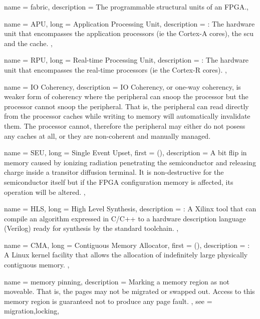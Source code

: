 {
	name = {fabric},
	description = {The programmable structural units of an FPGA.},
}

{
	name = {APU},
	long = {Application Processing Unit},
	description = {\emph{}:
		The hardware unit that encompasses the application processors (ie the Cortex-A cores),
		the \gls{scu} and the cache.
	},
}

{
	name = {RPU},
	long = {Real-time Processing Unit},
	description = {\emph{}:
		The hardware unit that encompasses the real-time processors (ie the Cortex-R cores).
	},
}


{
	name = {IO Coherency},
	description = {
		IO Coherency, or one-way coherency, is weaker form of coherency where
		the peripheral can snoop the processor but the processor cannot snoop the peripheral.
		That is, the peripheral can read directly from the processor caches while
		writing to memory will automatically invalidate them. The processor cannot,
		therefore the peripheral may either do not posess any caches at all, or they
		are non-coherent and manually managed.
	}
}


{
	name = {SEU},
	long = {Single Event Upset},
	first = { ()},
	description = {
		A bit flip in memory caused by ionizing radiation penetrating the semiconductor 
		and releasing charge inside a transitor diffusion terminal. It is non-destructive
		for the semiconductor itself but if the FPGA configuration memory is affected,
		its operation will be altered.
	},
}

{
	name = {HLS},
	long = {High Level Synthesis},
	description = {\emph{}:
		A Xilinx tool that can compile an algorithm expressed in C/C++ to 
		a hardware description language (Verilog) ready for synthesis by
		the standard toolchain.
	},
}


{
	name = {CMA},
	long = {Contiguous Memory Allocator},
	first = { ()},
	description = {	\emph{}:
		A Linux kernel facility that allows the allocation of indefinitely large physically
		contiguous memory.
	},
}

{
	name = {memory pinning},
	description = {
		Marking a memory region as not moveable. That is, the pages may not be migrated or swapped out.
		Access to this memory region is guaranteed not to produce any page fault.
	},
	see = {migration,locking},
}

